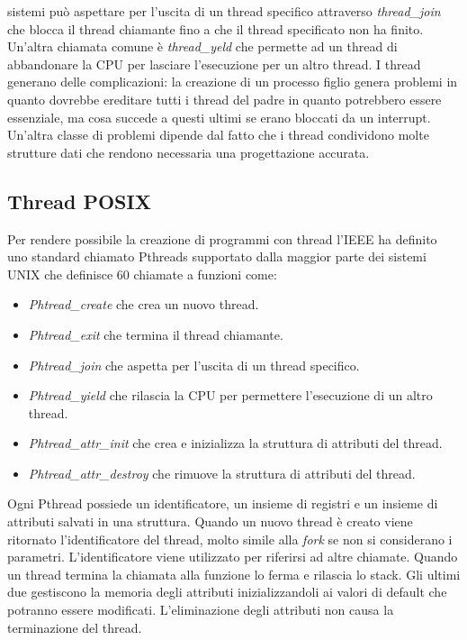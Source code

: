 sistemi pu\`o aspettare per l'uscita di un thread specifico attraverso \emph{thread\_join} che blocca il thread chiamante fino a che il thread specificato non ha finito. Un'altra 
chiamata comune \`e \emph{thread\_yeld} che permette ad un thread di abbandonare la CPU per lasciare l'esecuzione per un altro thread. I thread generano delle complicazioni: la 
creazione di un processo figlio genera problemi in quanto dovrebbe ereditare tutti i thread del padre in quanto potrebbero essere essenziale, ma cosa succede a questi ultimi se erano 
bloccati da un interrupt. Un'altra classe di problemi dipende dal fatto che i thread condividono molte strutture dati che rendono necessaria una progettazione accurata. 
\subsection{Thread POSIX}
Per rendere possibile la creazione di programmi con thread l'IEEE ha definito uno standard chiamato Pthreads supportato dalla maggior parte dei sistemi UNIX che definisce $60$ chiamate
a funzioni come:
\begin{itemize}
	\item \emph{Phtread\_create} che crea un nuovo thread.
	\item \emph{Phtread\_exit} che termina il thread chiamante.
	\item \emph{Phtread\_join} che aspetta per l'uscita di un thread specifico.
	\item \emph{Phtread\_yield} che rilascia la CPU per permettere l'esecuzione di un altro thread.
	\item \emph{Phtread\_attr\_init} che crea e inizializza la struttura di attributi del thread.
	\item \emph{Phtread\_attr\_destroy} che rimuove la struttura di attributi del thread.
\end{itemize}
Ogni Pthread possiede un identificatore, un insieme di registri e un insieme di attributi salvati in una struttura. Quando un nuovo thread \`e creato viene ritornato l'identificatore del
thread, molto simile alla \emph{fork} se non si considerano i parametri. L'identificatore viene utilizzato per riferirsi ad altre chiamate. Quando un thread termina la chiamata alla
funzione lo ferma e rilascia lo stack. Gli ultimi due gestiscono la memoria degli attributi inizializzandoli ai valori di default che potranno essere modificati. L'eliminazione degli
attributi non causa la terminazione del thread. 
